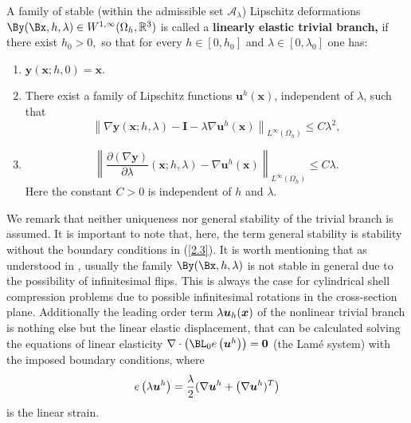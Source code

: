 \begin{definition}
\label{def:2.1}
A family of stable (within the admissible set $\mathcal{A}_\lambda$) Lipschitz deformations $\By(\Bx,h,\lambda)\in W^{1,\infty}(\Omega_h,\mathbb R^3)$ is called a \textbf{linearly elastic trivial branch,} if there exist $h_{0}>0,$ so that for every $h \in\left[0, h_{0}\right]$ and $\lambda \in\left[0, \lambda_{0}\right]$ one has:
\begin{enumerate}[label=(\roman*)]
\item $\bm y(\bm x; h,0)=\bm x.$ 
\item   There exist a family of Lipschitz functions $\boldsymbol{u}^{h}(\boldsymbol{x})$, independent of $\lambda$, such that
\begin{equation}
\label{2.4}
\left\|\nabla \boldsymbol{y}(\boldsymbol{x} ; h, \lambda)-\boldsymbol{I}-\lambda \nabla \boldsymbol{u}^{h}(\boldsymbol{x})\right\|_{L^{\infty}\left(\Omega_{h}\right)} \leq C \lambda^{2},
\end{equation}
\item 
\begin{equation}
\label{2.5}
\left\|\frac{\partial(\nabla \boldsymbol{y})}{\partial \lambda}(\boldsymbol{x} ; h, \lambda)-\nabla \boldsymbol{u}^{h}(\boldsymbol{x})\right\|_{L^{\infty}\left(\Omega_{h}\right)} \leq C \lambda.
\end{equation}
Here the constant $C>0$ is independent of $h$ and $\lambda$.
\end{enumerate}
\end{definition}
We remark that neither uniqueness nor general stability of the trivial branch is assumed. It is important to note that, here, the term general stability is stability without the boundary conditions in (\ref{2.3}). It is worth mentioning that as understood in \cite{bib:Gra.Tru.}, usually the family $\By(\Bx,h,\Gl)$ is not stable in general due to the possibility of infinitesimal flips. This is always the case for cylindrical shell compression problems due to possible infinitesimal rotations in the cross-section plane. Additionally the leading order term $\lambda\bm u_h(\bm x)$ of the nonlinear trivial branch is nothing else but the linear elastic displacement, that can be calculated solving the equations of linear elasticity  $\nabla \cdot\left(\BL_{0} e\left(\boldsymbol{u}^{h}\right)\right)=\mathbf{0}$ (the Lam\'e system) with the imposed boundary conditions, where $$e\left(\lambda\boldsymbol{u}^{h}\right)=\frac{\lambda}{2}(\nabla \boldsymbol{u}^{h}+\left(\nabla \boldsymbol{u}^{h})^{T}\right)$$ is the linear strain. 




